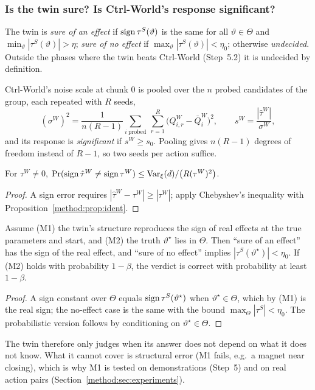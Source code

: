 \subsubsection{Is the twin sure? Is Ctrl-World's response significant?}
\begin{definition}
The twin is \emph{sure of an effect} if $\operatorname{sign}\tau^S(\vartheta)$ is the same for all $\vartheta\in\Theta$ and $\min_\vartheta|\tau^S(\vartheta)|>\eta$; \emph{sure of no effect} if $\max_\vartheta|\tau^S(\vartheta)|<\eta_0$; otherwise \emph{undecided}. Outside the phases where the twin beats Ctrl-World (Step~5.2) it is undecided by definition.
\end{definition}
Ctrl-World's noise scale at chunk 0 is pooled over the $n$ probed candidates of the group, each repeated with $R$ seeds,
\begin{equation}
(\sigma^W)^2=\frac{1}{n(R-1)}\sum_{i\ \mathrm{probed}}\ \sum_{r=1}^{R}\big(Q^W_{i,r}-\bar Q^W_i\big)^2,\qquad s^W=\frac{|\hat\tau^W|}{\sigma^W},
\end{equation}
and its response is \emph{significant} if $s^W\ge s_0$. Pooling gives $n(R-1)$ degrees of freedom instead of $R-1$, so two seeds per action suffice.

\begin{proposition}\label{method:prop:signW}
For $\tau^W\neq0$, $\Pr(\operatorname{sign}\hat\tau^W\neq\operatorname{sign}\tau^W)\le\operatorname{Var}_\xi(d)/\big(R(\tau^W)^2\big)$.
\end{proposition}
\begin{proof}
A sign error requires $|\hat\tau^W-\tau^W|\ge|\tau^W|$; apply Chebyshev's inequality with Proposition~\ref{method:prop:ident}.
\end{proof}

\begin{proposition}\label{method:prop:sound}
Assume (M1) the twin's structure reproduces the sign of real effects at the true parameters and start, and (M2) the truth $\vartheta^\star$ lies in $\Theta$. Then ``sure of an effect'' has the sign of the real effect, and ``sure of no effect'' implies $|\tau^S(\vartheta^\star)|<\eta_0$. If (M2) holds with probability $1-\beta$, the verdict is correct with probability at least $1-\beta$.
\end{proposition}
\begin{proof}
A sign constant over $\Theta$ equals $\operatorname{sign}\tau^S(\vartheta^\star)$ when $\vartheta^\star\in\Theta$, which by (M1) is the real sign; the no-effect case is the same with the bound $\max_\Theta|\tau^S|<\eta_0$. The probabilistic version follows by conditioning on $\vartheta^\star\in\Theta$.
\end{proof}
The twin therefore only judges when its answer does not depend on what it does not know. What it cannot cover is structural error (M1 fails, e.g.\ a magnet near closing), which is why M1 is tested on demonstrations (Step~5) and on real action pairs (Section~\ref{method:sec:experiments}).


